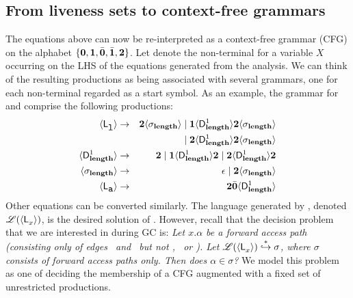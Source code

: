 \documentclass[9pt]{sigplanconf}
\begin{document}
\subsection{From liveness sets to context-free grammars}\label{sec:grammar-formulation}      

The  equations  above can  now  be  re-interpreted as  a  context-free
grammar  (CFG) on  the  alphabet $\lbrace\mathbf{0},  \mathbf{1}, \bar{\mathbf{0}},  \bar{\mathbf{1}},
{\mathbf{2}}\rbrace$.  Let  denote  the non-terminal for a variable
$X$ occurring on the LHS of the equations generated from the analysis.
We can  think of  the resulting productions  as being  associated with
several grammars, one for  each non-terminal  regarded
as a start symbol.  As  an example, the grammar for \var{\Lanv{\xl}{}}
and \var{\Lanv{\pa}{}} comprise the following productions:
\begin{eqnarray*}
  \langle \mathsf{L}_{{\mbox{\tt l}}}^{}\rangle  &\rightarrow& 
  {\mathbf{2}}\langle \sigma_{\mathbf{length}}\rangle \mid \mathbf{1} \langle \mathsf{D}_{\mathit {\mathbf{length}}}^{1}\rangle{\ensuremath{{\mathbf{2}}}\ensuremath{\langle \sigma_{\mathbf{length}}\rangle}}  \\ && \mid
  {\mathbf{2}}\langle \mathsf{D}_{\mathit {\mathbf{length}}}^{1}\rangle{\ensuremath{{\mathbf{2}}}\ensuremath{\langle \sigma_{\mathbf{length}}\rangle}} \\
  \langle \mathsf{D}_{\mathit {\mathbf{length}}}^{1}\rangle &\rightarrow& {\mathbf{2}} \mid
  \mathbf{1}\langle \mathsf{D}_{\mathit {\mathbf{length}}}^{1}\rangle{\mathbf{2}}
       \mid {\mathbf{2}}\langle \mathsf{D}_{\mathit {\mathbf{length}}}^{1}\rangle{\ensuremath{{\mathbf{2}}}}\\
\langle {\sigma_{\ensuremath{\mathbf{length}}}} \rangle
&\rightarrow&
\epsilon  \mid {\mathbf{2}}\langle{\sigma_{\ensuremath{\mathbf{length}}}}\rangle \\
\langle \mathsf{L}_{{\mbox{\tt a}}}^{}\rangle &\rightarrow& {\mathbf{2}} \bar{\mathbf{0}} \langle \mathsf{D}_{\mathit {\mathbf{length}}}^{1}\rangle
\end{eqnarray*}
Other  equations  can   be  converted  similarly.   The
language   generated   by  ,   denoted
$\mathscr{L}(\langle \mathsf{L}_{{x}}^{}\rangle)$,   is    the   desired
solution  of  .    
However, recall that the decision problem that we are interested in
during GC is: 
{\em
Let $x.\alpha$ be a forward access path (consisting only
of edges  \acar\ and \acdr\  but not \bcar,  \bcdr\ or
\clazy).       Let      $\mathscr{L}(\langle \mathsf{L}_{{x}}^{}\rangle)
\stackrel{*}{\hookrightarrow}  \sigma$, where  $\sigma$
consists  of  forward  access  paths  only.  Then  does
$\alpha \in \sigma$?
}
We model  this problem as one  of deciding the
membership of  a CFG augmented  with a
fixed set of unrestricted productions.
\end{document}
